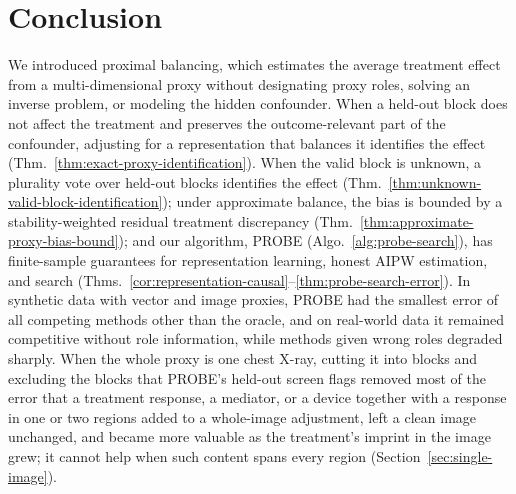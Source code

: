 \section{Conclusion}
\label{sec:main-conclusion}

We introduced proximal balancing, which estimates the average treatment effect from a multi-dimensional proxy without designating proxy roles, solving an inverse problem, or modeling the hidden confounder. When a held-out block does not affect the treatment and preserves the outcome-relevant part of the confounder, adjusting for a representation that balances it identifies the effect (Thm.~\ref{thm:exact-proxy-identification}). When the valid block is unknown, a plurality vote over held-out blocks identifies the effect (Thm.~\ref{thm:unknown-valid-block-identification}); under approximate balance, the bias is bounded by a stability-weighted residual treatment discrepancy (Thm.~\ref{thm:approximate-proxy-bias-bound}); and our algorithm, PROBE (Algo.~\ref{alg:probe-search}), has finite-sample guarantees for representation learning, honest AIPW estimation, and search (Thms.~\ref{cor:representation-causal}--\ref{thm:probe-search-error}). In synthetic data with vector and image proxies, PROBE had the smallest error of all competing methods other than the oracle, and on real-world data it remained competitive without role information, while methods given wrong roles degraded sharply. When the whole proxy is one chest X-ray, cutting it into blocks and excluding the blocks that PROBE's held-out screen flags removed most of the error that a treatment response, a mediator, or a device together with a response in one or two regions added to a whole-image adjustment, left a clean image unchanged, and became more valuable as the treatment's imprint in the image grew; it cannot help when such content spans every region (Section~\ref{sec:single-image}).
